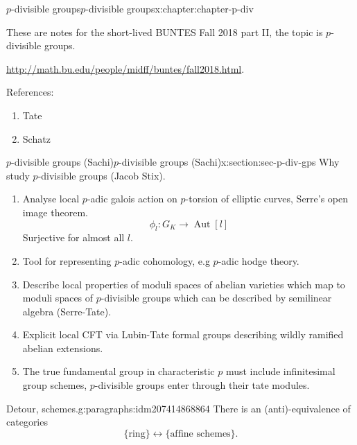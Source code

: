 \documentclass[oneside,10pt,]{book}
\numberwithin{equation}{section}
\newcommand{\lb}{[}
\newcommand{\rb}{]}
\DeclareMathOperator{\Aut}{Aut}
\begin{document}
\begin{chapterptx}{\(p\)-divisible groups}{}{\(p\)-divisible groups}{}{}{x:chapter:chapter-p-div}
\begin{introduction}{}%
These are notes for the short-lived BUNTES Fall 2018 part II, the topic is \(p\)-divisible groups.%
\par
\url{http://math.bu.edu/people/midff/buntes/fall2018.html}.%
\par
References:%
\begin{enumerate}
\item{}Tate%
\item{}Schatz%
\end{enumerate}
%
\end{introduction}%
%
%
\typeout{************************************************}
\typeout{************************************************}
%
\begin{sectionptx}{\(p\)-divisible groups (Sachi)}{}{\(p\)-divisible groups (Sachi)}{}{}{x:section:sec-p-div-gps}
Why study  \(p\)-divisible groups (Jacob Stix).%
\begin{enumerate}
\item{}Analyse local \(p\)-adic galois action on \(p\)-torsion of elliptic curves, Serre's open image theorem.%
\begin{equation*}
\phi_l \colon G_K \to \Aut \lb l \rb
\end{equation*}
Surjective for almost all \(l\).%
\item{}Tool for representing \(p\)-adic cohomology, e.g \(p\)-adic hodge theory.%
\item{}Describe local properties of moduli spaces of abelian varieties which map to moduli spaces of \(p\)-divisible groups which can be described by semilinear algebra (Serre-Tate).%
\item{}Explicit local CFT via Lubin-Tate formal groups describing wildly ramified abelian extensions.%
\item{}The true fundamental group in characteristic \(p\) must include infinitesimal group schemes, \(p\)-divisible groups enter through their tate modules.%
\end{enumerate}
%
\begin{paragraphs}{Detour, schemes.}{g:paragraphs:idm207414868864}%
There is an (anti)-equivalence of categories%
\begin{equation*}
\{\text{ring}\} \leftrightarrow\{\text{affine schemes}\}\text{.}
\end{equation*}

\end{paragraphs}
\end{sectionptx}
\end{chapterptx}
\end{document}
